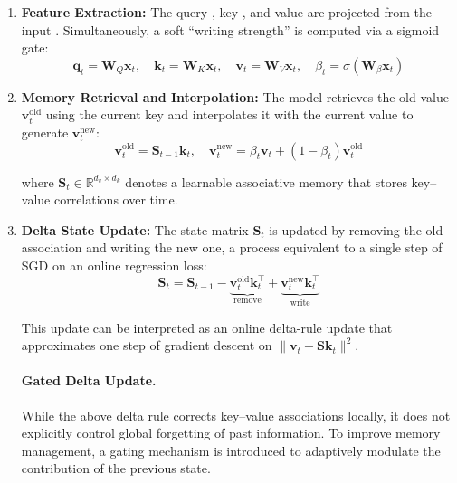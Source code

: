 \documentclass{llmxive}
\begin{document}
\begin{enumerate}
\item \textbf{Feature Extraction:} The query , key , and value  are projected from the input . Simultaneously, a soft ``writing strength''  is computed via a sigmoid gate:
\begin{equation}
\mathbf{q}_t = \mathbf{W}_Q \mathbf{x}_t, \quad \mathbf{k}_t = \mathbf{W}_K \mathbf{x}_t, \quad \mathbf{v}_t = \mathbf{W}_V \mathbf{x}_t, \quad \beta_t = \sigma(\mathbf{W}_\beta \mathbf{x}_t)
\end{equation}

\item \textbf{Memory Retrieval and Interpolation:} The model retrieves the old value $\mathbf{v}_t^{\text{old}}$ using the current key and interpolates it with the current value to generate $\mathbf{v}_t^{\text{new}}$:
\begin{equation}
    \mathbf{v}_t^{\text{old}} = \mathbf{S}_{t-1} \mathbf{k}_t, \quad \mathbf{v}_t^{\text{new}} = \beta_t \mathbf{v}_t + (1 - \beta_t) \mathbf{v}_t^{\text{old}}
\end{equation}

where $\mathbf{S}_t \in \mathbb{R}^{d_v \times d_k}$ denotes a learnable associative memory that stores key–value correlations over time.

\item \textbf{Delta State Update:} The state matrix $\mathbf{S}_t$ is updated by removing the old association and writing the new one, a process equivalent to a single step of SGD on an online regression loss:
\begin{equation}
    \mathbf{S}_t = \mathbf{S}_{t-1} - \underbrace{\mathbf{v}_t^{\text{old}} \mathbf{k}_t^\top}_{\text{remove}} + \underbrace{\mathbf{v}_t^{\text{new}} \mathbf{k}_t^\top}_{\text{write}}
\end{equation}

This update can be interpreted as an online delta-rule update that approximates one step of gradient descent on $\|\mathbf{v}_t - \mathbf{S}\mathbf{k}_t\|^2$.

\paragraph{Gated Delta Update.}
While the above delta rule corrects key–value associations locally, it does not explicitly control global forgetting of past information. To improve memory management, a gating mechanism is introduced to adaptively modulate the contribution of the previous state.


\end{enumerate}
\end{document}

